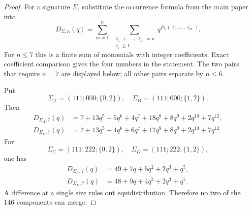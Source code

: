 \documentclass[10pt]{article}
\begin{document}
\begin{proof}
\enlargethispage{2\baselineskip}
For a signature $\Sigma$, substitute the occurrence formula from the main
paper into
\[
D_{\Sigma,n}(q)
=\sum_{m=1}^{n}\ \sum_{\substack{\ell_1+\cdots+\ell_m=n\\
\ell_i\ge1}}q^{P_\Sigma(\ell_1,\ldots,\ell_m)}.
\]
For $n\le7$ this is a finite sum of monomials with integer coefficients.
Exact coefficient comparison gives the four numbers in the statement.
The two pairs that require $n=7$ are displayed below; all other pairs
separate by $n\le6$.

Put
\[
\Sigma_A=(111;000;\{0,2\}),\quad
\Sigma_B=(111;000;\{1,2\}).
\]
Then
\[
\begin{aligned}
D_{\Sigma_A,7}(q)
 &=7+13q^5+5q^6+4q^7+18q^8+8q^9+2q^{10}+7q^{12},\\
D_{\Sigma_B,7}(q)
 &=7+13q^5+4q^6+6q^7+17q^8+8q^9+2q^{10}+7q^{12}.
\end{aligned}
\]
For
\[
\Sigma_C=(111;222;\{0,2\}),\quad
\Sigma_D=(111;222;\{1,2\}),
\]
one has
\[
\begin{aligned}
D_{\Sigma_C,7}(q)&=49+7q+5q^2+2q^3+q^5,\\
D_{\Sigma_D,7}(q)&=48+9q+4q^2+2q^3+q^5.
\end{aligned}
\]
A difference at a single size rules out equidistribution.  Therefore no two
of the $146$ components can merge.
\end{proof}
\end{document}
